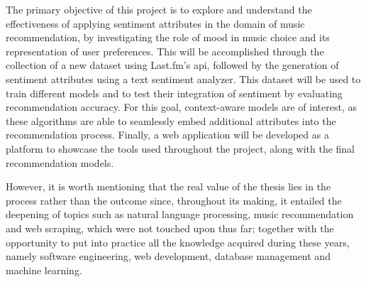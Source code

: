 The primary objective of this project is to explore and understand the effectiveness of applying sentiment attributes in the domain of music recommendation, by investigating the role of mood in music choice and its representation of user preferences. This will be accomplished through the collection of a new dataset using Last.fm's \ac{api}, followed by the generation of sentiment attributes using a text sentiment analyzer. This dataset will be used to train different models and to test their integration of sentiment by evaluating recommendation accuracy. For this goal, context-aware models are of interest, as these algorithms are able to seamlessly embed additional attributes into the recommendation process. Finally, a web application will be developed as a platform to showcase the tools used throughout the project, along with the final recommendation models.

However, it is worth mentioning that the real value of the thesis lies in the process rather than the outcome since, throughout its making, it entailed the deepening of topics such as natural language processing, music recommendation and web scraping, which were not touched upon thus far; together with the opportunity to put into practice all the knowledge acquired during these years, namely software engineering, web development, database management and machine learning.